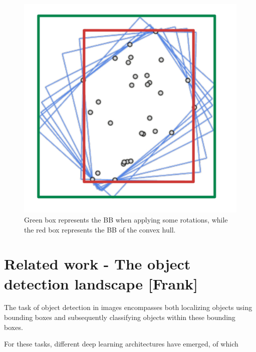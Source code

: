 \documentclass[a4paper]{article}
\begin{document}

\begin{figure}[h]
\centering
\includegraphics[scale=0.19]{images/ch_vs_bb} 
\caption{Green box represents the BB when applying some rotations, while the red box represents the BB of the convex hull.}
\label{bb-ch}
\end{figure}

\section{Related work - The object detection landscape [Frank]}
The task of object detection in images encompasses both localizing objects using bounding boxes and subsequently classifying objects within these bounding boxes.

For these tasks, different deep learning architectures have emerged, of which 
\end{document}
